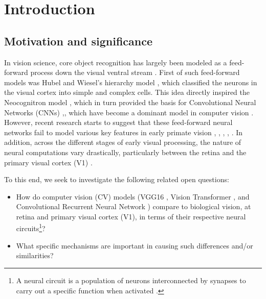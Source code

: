 \chapter{Introduction} 
\label{chapter-intro} 


\section{Motivation and significance}
\label{intro-motivation}
In vision science, core object recognition has largely been modeled as a feed-forward process down the visual ventral stream \cite{dicarlo_how_2012}. First of such feed-forward models was Hubel and Wiesel's hierarchy model \cite{hubel_receptive_1962}, which classified the neurons in the visual cortex into simple and complex cells. This idea directly inspired the Neocognitron model \cite{fukushima_neocognitron_1980}, which in turn provided the basis for Convolutional Neural Networks (CNNs) \cite{alexnet},\cite{lenet}, which have become a dominant model in computer vision \cite{yamashita_convolutional_2018}. However, recent research starts to suggest that these feed-forward neural networks fail to model various key features in early primate vision  \cite{oreilly_recurrent_2013}, \cite{spoerer_recurrent_2017}, \cite{ricci_same-different_2018}, \cite{kietzmann_recurrence_2019}, \cite{van_bergen_going_2020}. In addition, across the different stages of early visual processing, the nature of neural computations vary drastically, particularly between the retina and the primary visual cortex (V1) \cite{dyballa_manifold_2021}. 

To this end, we seek to investigate the following related open questions:
\begin{itemize}[noitemsep, topsep=0pt]
    \item How do computer vision (CV) models (VGG16 \cite{vgg16_simonyan_very_2015}, Vision Transformer \cite{vit_dosovitskiy_image_2021}, and Convolutional Recurrent Neural Network \cite{convrnn_shi_end--end_2015}) compare to biological vision, at retina and primary visual cortex (V1), in terms of their respective neural circuits\footnote{A neural circuit is a population of neurons interconnected by synapses to carry out a specific function when activated \cite{gerhard_neuroscience_2013}.}?
     
    \item What specific mechanisms are important in causing such differences and/or similarities?
\end{itemize}

